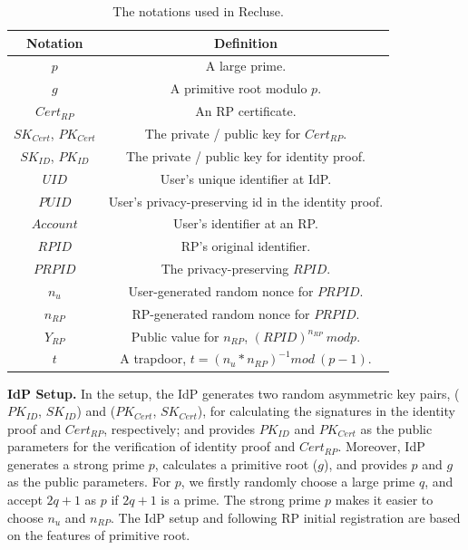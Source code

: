 \begin{table}[tb]
    \caption{The notations used in Recluse.}
    \centering
    \begin{tabular}{|c|c|}
    \hline
    {Notation} & {Definition} \\
    \hline
    {$p$} & {A large prime.} \\
    \hline
    {$g$} & {A primitive root  modulo $p$.} \\
    \hline
    {$Cert_{RP}$} & {An RP certificate.} \\
    \hline
    {$SK_{Cert}$, $PK_{Cert}$} & {The private / public key for $Cert_{RP}$.} \\
    \hline
    {$SK_{ID}$, $PK_{ID}$} & {The private / public key for  identity proof.} \\
    \hline
    {$UID$} & {User's unique identifier at IdP.} \\
    \hline
    {$PUID$} & {User's privacy-preserving id in the identity proof.} \\
    \hline
    {$Account$} & {User's identifier at an RP.} \\
    \hline
    {$RPID$} & {RP's original identifier.} \\
    \hline
    {$PRPID$} & {The privacy-preserving $RPID$.} \\
    \hline
    {$n_u$} & {User-generated random nonce for $PRPID$. } \\
    \hline
    {$n_{RP}$} & {RP-generated random nonce for $PRPID$. } \\
    \hline
    {$Y_{RP}$} & {Public value for $n_{RP}$, $(RPID)^{n_{RP}} \ mod p$. } \\
    \hline
    {$t$} & {A trapdoor, $t=(n_u*n_{RP})^{-1} mod \ (p-1)$. } \\
    \hline
    \end{tabular}
    \label{tbl:notations}
\end{table}

\noindent\textbf{IdP Setup.} In the setup, the IdP generates two random asymmetric key pairs, ($PK_{ID}$, $SK_{ID}$) and ($PK_{Cert}$, $SK_{Cert}$), for calculating the signatures in the identity proof and $Cert_{RP}$, respectively; and provides $PK_{ID}$ and $PK_{Cert}$ as the public parameters for the verification of identity proof and $Cert_{RP}$. Moreover, IdP generates a strong prime $p$, calculates  a primitive root ($g$), and provides $p$ and $g$ as the public parameters. For $p$, we firstly randomly choose a large prime $q$, and accept  $2q+1$ as $p$ if $2q+1$ is a prime. The strong prime $p$ makes it easier to choose $n_{u}$ and $n_{RP}$. %
The IdP setup and following RP initial registration are based on the features of primitive root.

